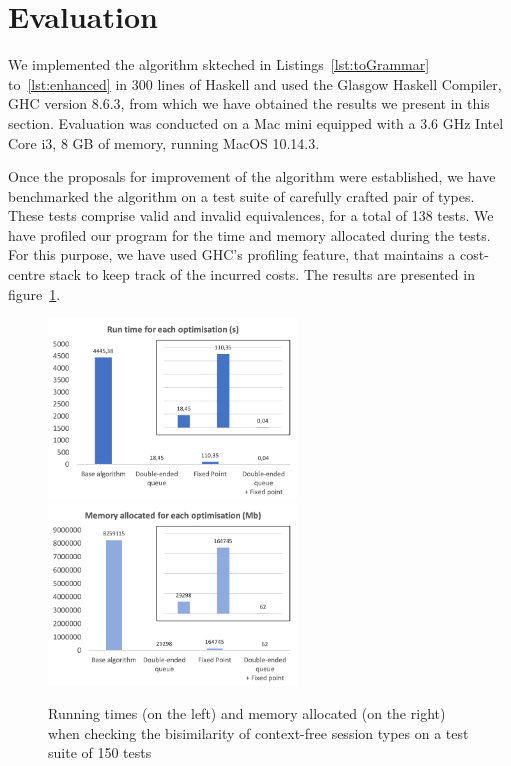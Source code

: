 \section{Evaluation}
\label{sec:evaluation}


We implemented the algorithm skteched in Listings~\ref{lst:toGrammar}
to~\ref{lst:enhanced} in 300 lines of Haskell and used the Glasgow
Haskell Compiler, GHC version 8.6.3, from which we have obtained the
results we present in this section.  Evaluation was conducted on a Mac
mini equipped with a 3.6 GHz Intel Core i3, 8 GB of memory, running
MacOS 10.14.3.

Once the proposals for improvement of the algorithm were established,
we have benchmarked the algorithm on a test suite of carefully crafted
pair of types. These tests comprise valid and invalid equivalences,
for a total of 138 tests. We have profiled our program for the time
and memory allocated during the tests. For this purpose, we have used
GHC's profiling feature, that maintains a cost-centre stack to keep
track of the incurred costs. The results are presented in
figure~\ref{fig:results}.

\begin{figure}[h]
  \includegraphics[height=4.8cm]{img/run_time}
  \quad 
  \includegraphics[height=4.8cm]{img/memory_alloc}	
  \caption{Running times (on the left) and memory allocated (on the
    right) when checking the bisimilarity of context-free session
    types on a test suite of 150 tests}
  \label{fig:results}
\end{figure}

